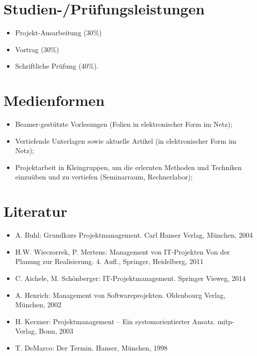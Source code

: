 \section*{Studien-/Prüfungsleistungen\label{/mi-2017/modulbeschreibungen-bachelor/BA_Projektmanagement}}\label{studien-pruxfcfungsleistungenpathlabelmi-2017modulbeschreibungen-bachelorbaux5fprojektmanagement}

\begin{itemize}
\tightlist
\item
  Projekt-Ausarbeitung (30\%)
\item
  Vortrag (30\%)
\item
  Schriftliche Prüfung (40\%).
\end{itemize}

\section*{Medienformen\label{/mi-2017/modulbeschreibungen-bachelor/BA_Projektmanagement}}\label{medienformenpathlabelmi-2017modulbeschreibungen-bachelorbaux5fprojektmanagement}

\begin{itemize}
\tightlist
\item
  Beamer-gestützte Vorlesungen (Folien in elektronischer Form im Netz);
\item
  Vertiefende Unterlagen sowie aktuelle Artikel (in elektronischer Form
  im Netz);
\item
  Projektarbeit in Kleingruppen, um die erlernten Methoden und Techniken
  einzuüben und zu vertiefen (Seminarraum, Rechnerlabor);
\end{itemize}

\section*{Literatur\label{/mi-2017/modulbeschreibungen-bachelor/BA_Projektmanagement}}\label{literaturpathlabelmi-2017modulbeschreibungen-bachelorbaux5fprojektmanagement}

\begin{itemize}
\tightlist
\item
  A. Buhl: Grundkurs Projektmanagement. Carl Hanser Verlag, München,
  2004
\item
  H.W. Wieczorrek, P. Mertens: Management von IT-Projekten Von der
  Planung zur Realisierung. 4. Aufl., Springer, Heidelberg, 2011
\item
  C. Aichele, M. Schönberger: IT-Projektmanagement. Springer Vieweg,
  2014
\item
  A. Henrich: Management von Softwareprojekten. Oldenbourg Verlag,
  München, 2002
\item
  H. Kerzner: Projektmanagement -- Ein systemorientierter Ansatz.
  mitp-Verlag, Bonn, 2003
\item
  T. DeMarco: Der Termin. Hanser, München, 1998
\end{itemize}

